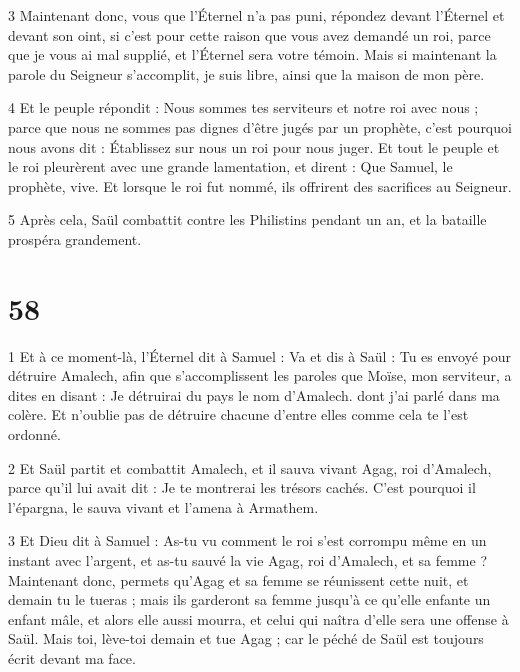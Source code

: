 \par 3 Maintenant donc, vous que l'Éternel n'a pas puni, répondez devant l'Éternel et devant son oint, si c'est pour cette raison que vous avez demandé un roi, parce que je vous ai mal supplié, et l'Éternel sera votre témoin. Mais si maintenant la parole du Seigneur s'accomplit, je suis libre, ainsi que la maison de mon père.

\par 4 Et le peuple répondit : Nous sommes tes serviteurs et notre roi avec nous ; parce que nous ne sommes pas dignes d'être jugés par un prophète, c'est pourquoi nous avons dit : Établissez sur nous un roi pour nous juger. Et tout le peuple et le roi pleurèrent avec une grande lamentation, et dirent : Que Samuel, le prophète, vive. Et lorsque le roi fut nommé, ils offrirent des sacrifices au Seigneur.

\par 5 Après cela, Saül combattit contre les Philistins pendant un an, et la bataille prospéra grandement.

\chapter{58}

\par 1 Et à ce moment-là, l'Éternel dit à Samuel : Va et dis à Saül : Tu es envoyé pour détruire Amalech, afin que s'accomplissent les paroles que Moïse, mon serviteur, a dites en disant : Je détruirai du pays le nom d'Amalech. dont j'ai parlé dans ma colère. Et n’oublie pas de détruire chacune d’entre elles comme cela te l’est ordonné.

\par 2 Et Saül partit et combattit Amalech, et il sauva vivant Agag, roi d'Amalech, parce qu'il lui avait dit : Je te montrerai les trésors cachés. C'est pourquoi il l'épargna, le sauva vivant et l'amena à Armathem.

\par 3 Et Dieu dit à Samuel : As-tu vu comment le roi s'est corrompu même en un instant avec l'argent, et as-tu sauvé la vie Agag, roi d'Amalech, et sa femme ? Maintenant donc, permets qu'Agag et sa femme se réunissent cette nuit, et demain tu le tueras ; mais ils garderont sa femme jusqu'à ce qu'elle enfante un enfant mâle, et alors elle aussi mourra, et celui qui naîtra d'elle sera une offense à Saül. Mais toi, lève-toi demain et tue Agag ; car le péché de Saül est toujours écrit devant ma face.

